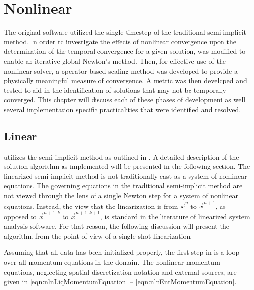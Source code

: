 \chapter{Nonlinear \cobra{}}
\label{chap:nln_solver}
The original \cobra{} software utilized the single timestep of the traditional semi-implicit method.
In order to investigate the effects of nonlinear convergence upon the determination of the temporal convergence for a given solution, \cobra{} was modified to enable an iterative global Newton's method.
Then, for effective use of the nonlinear solver, a operator-based scaling method was developed to provide a physically meaningful measure of convergence.
A metric was then developed and tested to aid in the identification of solutions that may not be temporally converged.
This chapter will discuss each of these phases of development as well several implementation specific practicalities that were identified and resolved.

\section{Linear \cobra{}}
\label{sect:linCobraAlg}

\cobra{} utilizes the semi-implicit method as outlined in .
A detailed description of the solution algorithm as implemented will be presented in the following section.
The linearized semi-implicit method is not traditionally cast as a system of nonlinear equations.
The governing equations in the traditional semi-implicit method are not viewed through the lens of a single Newton step for a system of nonlinear equations.
Instead, the view that the linearization is from $\vec{x}^{n}$ to $\vec{x}^{n+1}$, as opposed to $\vec{x}^{n+1, k}$ to $\vec{x}^{n+1, k+1}$, is standard in the literature of linearized system analysis software.
For that reason, the following discussion will present the algorithm from the point of view of a single-shot linearization.

Assuming that all data has been initialized properly, the first step in \cobra{} is a loop over all momentum equations in the domain.
The nonlinear momentum equations, neglecting spatial discretization notation and external sources, are given in \eqref{eqn:nlnLiqMomentumEquation} -- \eqref{eqn:nlnEntMomentumEquation}.

